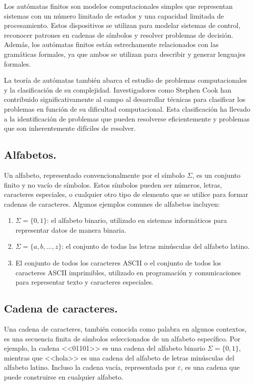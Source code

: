 \documentclass{article}
\begin{document}
        Los autómatas finitos son modelos computacionales simples que representan sistemas con un número limitado de estados y una capacidad
        limitada de procesamiento. Estos dispositivos se utilizan para modelar sistemas de control, reconocer patrones en cadenas de
        símbolos y resolver problemas de decisión. Además, los autómatas finitos están estrechamente relacionados con las gramáticas
        formales, ya que ambos se utilizan para describir y generar lenguajes formales.

        La teoría de autómatas también abarca el estudio de problemas computacionales y la clasificación de su complejidad. Investigadores
        como Stephen Cook han contribuido significativamente al campo al desarrollar técnicas para clasificar los problemas en función de
        su dificultad computacional. Esta clasificación ha llevado a la identificación de problemas que pueden resolverse eficientemente y
        problemas que son inherentemente difíciles de resolver.\cite{hopcroft2007introduccion}

    \subsection{Alfabetos.}
        Un alfabeto, representado convencionalmente por el símbolo $\Sigma$, es un conjunto finito y no vacío de símbolos.
        Estos símbolos pueden ser números, letras, caracteres especiales, o cualquier otro tipo de elemento que se utilice para formar
        cadenas de caracteres. Algunos ejemplos comunes de alfabetos incluyen:

        \begin{enumerate}
            \item $\Sigma=\{0,1\}$: el alfabeto binario, utilizado en sistemas informáticos para representar datos de manera binaria.
            \item $\Sigma=\{a,b,\ldots,z\}$: el conjunto de todas las letras minúsculas del alfabeto latino.
            \item El conjunto de todos los caracteres ASCII o el conjunto de todos los caracteres ASCII imprimibles, utilizado en programación y comunicaciones
            para representar texto y caracteres especiales.\cite{hopcroft2007introduccion}
        \end{enumerate}
    \subsection{Cadena de caracteres.}
        Una cadena de caracteres, también conocida como palabra en algunos contextos, es una secuencia finita de símbolos seleccionados de
        un alfabeto específico. Por ejemplo, la cadena <<01101>> es una cadena del alfabeto binario $\Sigma = \{0,1\}$, mientras que <<hola>>
        es una cadena del alfabeto de letras minúsculas del alfabeto latino. Incluso la cadena vacía, representada por $\varepsilon$, es
        una cadena que puede construirse en cualquier alfabeto.\cite{hopcroft2007introduccion}
\end{document}
